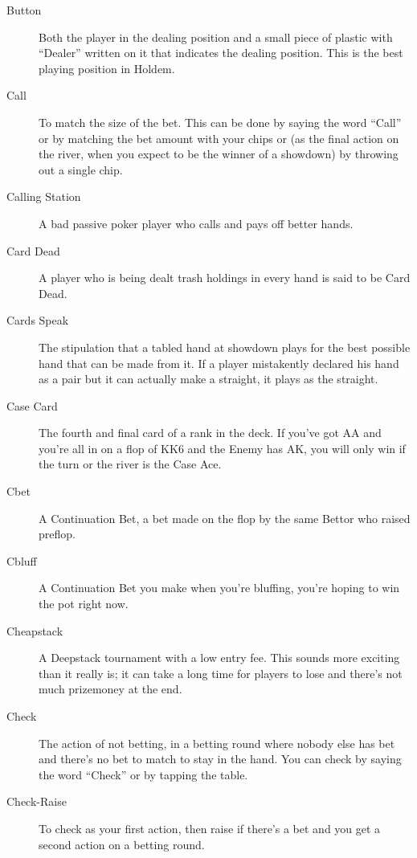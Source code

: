\begin{description}
\item[Button] Both the player in the dealing position and a small
piece of plastic with ``Dealer'' written on it that indicates the
dealing position. This is the best playing position in Holdem.

\item[Call] To match the size of the bet. This can be done by saying
the word ``Call'' or by matching the bet amount with your chips or
(as the final action on the river, when you expect to be the winner of
a showdown) by throwing out a single chip.

\item[Calling Station] A bad passive poker player who calls and pays
off better hands.

\item[Card Dead] A player who is being dealt trash holdings in every
hand is said to be Card Dead.

\item[Cards Speak] The stipulation that a tabled hand at showdown
plays for the best possible hand that can be made from it. If a player
mistakently declared his hand as a pair but it can actually make a
straight, it plays as the straight.

\item[Case Card] The fourth and final card of a rank in the deck. If
you've got AA and you're all in on a flop of KK6 and the Enemy has AK,
you will only win if the turn or the river is the Case Ace.

\item[Cbet] A Continuation Bet, a bet made on the flop by the same Bettor
who raised preflop.

\item[Cbluff] A Continuation Bet you make when you're bluffing, you're
hoping to win the pot right now.

\item[Cheapstack] A Deepstack tournament with a low entry fee. This
sounds more exciting than it really is; it can take a long time for
players to lose and there's not much prizemoney at the end.

\item[Check] The action of not betting, in a betting round where
nobody else has bet and there's no bet to match to stay in the hand.
You can check by saying the word ``Check'' or by tapping the table.

\item[Check-Raise] To check as your first action, then raise if
there's a bet and you get a second action on a betting round.


\end{description}
